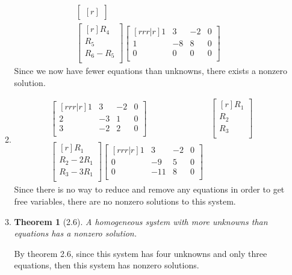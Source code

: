 \documentclass[12pt]{article}
\newtheorem*{theorem}{Theorem} %
\begin{document}
\begin{enumerate}
\begin{enumerate}
\begin{align*}
\begin{bmatrix}[r]
	\end{bmatrix}\\
	\begin{bmatrix}[r]
	R_4\\
	R_5\\
	R_6 - R_5\\
	\end{bmatrix}
	\begin{bmatrix}[rrr|r]
	1 & 3 & -2 & 0\\
	1 & -8 & 8 & 0\\
	0 & 0 & 0 & 0\\
	\end{bmatrix}&
	\end{align*}
	Since we now have fewer equations than unknowns, there exists a nonzero solution.
	\medskip
	
	\pagebreak
	\item
	\begin{align*}
	\begin{bmatrix}[rrr|r]
	1 & 3 & -2 & 0\\
	2 & -3 & 1 & 0\\
	3 & -2 & 2 & 0\\
	\end{bmatrix}&
	\begin{bmatrix}[r]
	R_1\\ R_2\\ R_3\\
	\end{bmatrix}\\
	\begin{bmatrix}[r]
	R_1\\
	R_2 - 2R_1\\
	R_3 - 3R_1\\
	\end{bmatrix}
	\begin{bmatrix}[rrr|r]
	1 & 3 & -2 & 0\\
	0 & -9 & 5 & 0\\
	0 & -11 & 8 & 0\\
	\end{bmatrix}&
	\end{align*}
	Since there is no way to reduce and remove any equations in order to get free variables, there are no nonzero solutions to this system.
	\medskip
	
	\item
	\begin{theorem}[2.6]
	A homogeneous system with more unknowns than equations has a nonzero solution.
	\end{theorem}
	By theorem 2.6, since this system has four unknowns and only three equations, then this system has nonzero solutions.
	\medskip	
	\end{enumerate}
	

\end{enumerate}
\end{document}
